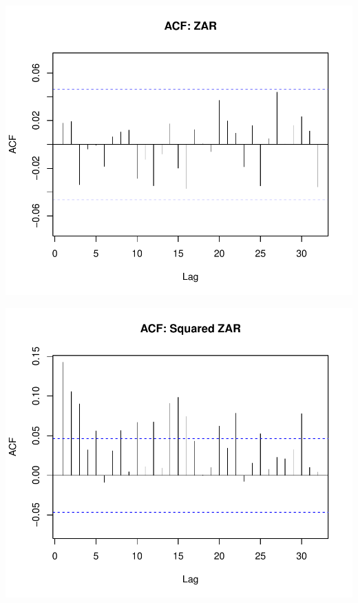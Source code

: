 \documentclass[12pt,preprint, authoryear]{elsarticle}
\numberwithin{equation}{section}
\numberwithin{figure}{section}
\numberwithin{table}{section}
\begin{document}
\includegraphics{Question-5_files/figure-latex/unnamed-chunk-4-1.pdf}

\includegraphics{Question-5_files/figure-latex/unnamed-chunk-5-1.pdf}
\end{document}
